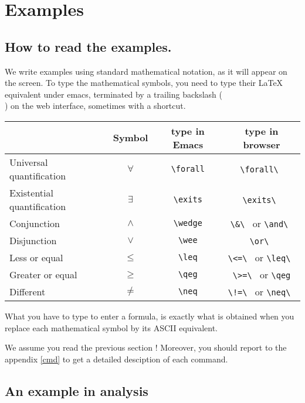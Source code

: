 
\chapter{Examples}

\section{How to read the examples.}

We write examples using standard mathematical notation, as it will
appear on the screen. To type the mathematical symbols, you need
to type their LaTeX equivalent under emacs, terminated by a trailing
backslash (\\) on the web interface, sometimes with a shortcut.

\begin{center}
\begin{tabular}{|l|c|c|c|}
\hline
& Symbol & type in Emacs & type in browser \\
\hline
Universal quantification & $\forall$ & \verb~\forall~ & \verb~\forall\~ \\
Existential quantification & $\exists$ & \verb~\exits~ & \verb~\exits\~ \\
Conjunction & $\land$ & \verb~\wedge~ & \verb~\&\~ or \verb~\and\~ \\
Disjunction & $\lor$ & \verb~\wee~ & \verb~\or\~ \\
Less or equal & $\leq$ & \verb~\leq~ & \verb~\<=\~ or \verb~\leq\~ \\
Greater or equal & $\geq$ & \verb~\qeg~ &  \verb~\>=\~ or \verb~\qeg~ \\
Different & $\neq$ & \verb~\neq~ & \verb~\!=\~ or \verb~\neq\~ \\
\hline
\end{tabular}
\end{center}

What you have to type to enter a formula, is exactly what is obtained
when you replace each mathematical symbol by its ASCII equivalent.

We assume you read the previous section ! Moreover, you should report to
the appendix \ref{cmd} to get a detailed desciption of each command.


\section{An example in analysis}

